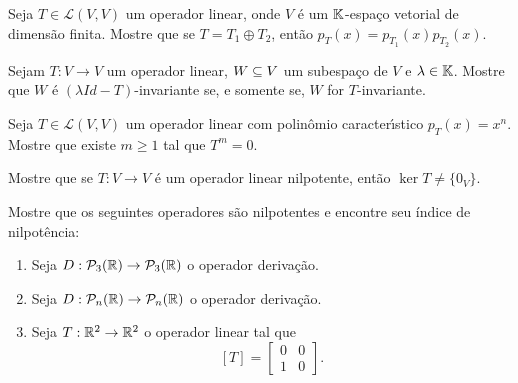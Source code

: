 \documentclass[12pt]{exam}
\begin{document}
\begin{exercicio}
Seja $T \in \mathcal{L}(V,V)$ um operador linear, onde $V$ é um $\mathbb{K}$-espaço vetorial de dimensão finita. Mostre que se $T = T_1 \oplus T_2$, ent\~ao $p_T(x) = p_{T_1}(x)p_{T_2}(x)$.
\end{exercicio}

\begin{exercicio}
  Sejam $T : V \to V$ um operador linear, $W \subseteq V$ um subespa\c{c}o de $V$ e $\lambda \in \mathbb{K}$. Mostre que $W$ \'e $(\lambda Id - T)$-invariante se, e somente se, $W$ for $T$-invariante.
\end{exercicio}

\begin{exercicio}
  Seja $T \in \mathcal{L}(V,V)$ um operador linear com polin\^omio caracter{\'\i}stico $p_T(x) = x^n$. Mostre que existe $m \ge 1$ tal que $T^m = 0$.
\end{exercicio}


\begin{exercicio}
  Mostre que se $T : V \to V$ \'e um operador linear nilpotente, ent\~ao $\ker T \ne \{0_V\}$.
\end{exercicio}

\begin{exercicio}
  Mostre que os seguintes operadores s\~ao nilpotentes e encontre seu \'indice de nilpot\^encia:
  \begin{enumerate}[label=({\alph*})]
    \item Seja $D : \mathcal{P}_3(\mathbb{R}) \to \mathcal{P}_3(\mathbb{R})$ o operador deriva\c{c}\~ao.
    \item Seja $D : \mathcal{P}_n(\mathbb{R}) \to \mathcal{P}_n(\mathbb{R})$ o operador deriva\c{c}\~ao.
    \item Seja $T : \mathbb{R}^2 \to \mathbb{R}^2$ o operador linear tal que
    \[
      [T] = \begin{bmatrix}
        0 & 0\\
        1 & 0
      \end{bmatrix}.
    \]
  \end{enumerate}
\end{exercicio}
\end{document}
